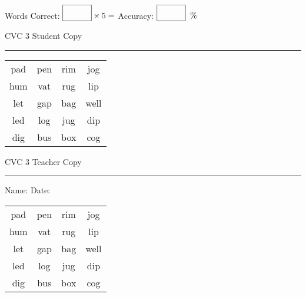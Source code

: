 \documentclass{memoir}
\begin{document}
\small

Words Correct: $\fbox{\phantom{\huge 100}} \times 5 = $ Accuracy: $\fbox{\phantom{\huge 100}}\;\; \%$ 

\vfill

\newpage


\footnotesize \noindent
CVC 3 \hfill Student Copy
\smallskip
\hrule

\Large

\setlength{\tabcolsep}{14pt}
\def\arraystretch{2}

{\selectfont


\begin{vplace}[0.5]
\begin{center}
\begin{tabular}{cccc}
pad & pen & rim & jog \\
hum & vat & rug & lip \\
let & gap & bag & well \\
led & log & jug & dip \\
dig & bus & box & cog \\
\end{tabular}
\end{center}
\end{vplace}

}

\newpage

\footnotesize \noindent
CVC 3 \hfill Teacher Copy
\smallskip
\hrule

\small

\vfill

\noindent
Name: \underline{\hspace{1.75in}} \hfill Date: \underline{\hspace{1in}}

\Large

{\selectfont


\begin{vplace}[0.5]
\begin{center}
\begin{tabular}{cccc}
pad & pen & rim & jog \\
hum & vat & rug & lip \\
let & gap & bag & well \\
led & log & jug & dip \\
dig & bus & box & cog \\
\end{tabular}
\end{center}
\end{vplace}



}
\end{document}
